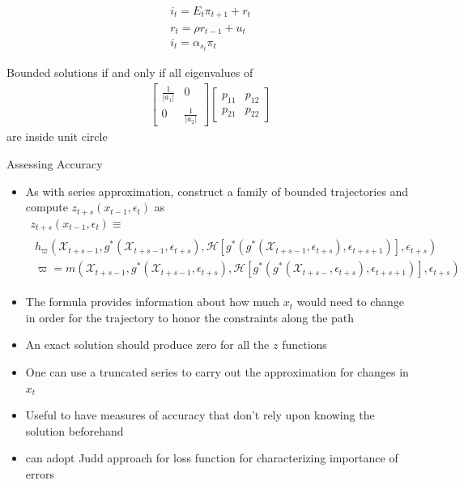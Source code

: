 \documentclass[12pt]{article}
\begin{document}
\cite{troy2007}
\begin{gather}
  \label{eq:4}
  i_t =E_t \pi_{t+1} + r_t\\
r_t= \rho r_{t-1} +u_t\\
i_t=\alpha_{s_t} \pi_t
\end{gather}

Bounded solutions if and only if all eigenvalues of 
\begin{gather}
  \label{eq:5}
  \begin{bmatrix}
    \frac{1}{|a_1|}&0\\
0&    \frac{1}{|a_2|}
  \end{bmatrix}
  \begin{bmatrix}
    p_{11}&p_{12}\\p_{21}&p_{22}
  \end{bmatrix}
\end{gather}
 are inside unit circle




  {Assessing Accuracy}
{\small

  \begin{itemize}
  \item As with series approximation,
 construct a family of bounded trajectories and compute
$  z_{t+s}(x_{t-1},\epsilon_t)$ as  %
{
\begin{gather}
  z_{t+s}(x_{t-1},\epsilon_t) \equiv\\
   \begin{split}
 h_{\varpi}(\mathcal{X}_{t+s-1},g^\ast(\mathcal{X}_{t+s-1},\epsilon_{t+s}),\mathcal{H}[g^\ast(g^\ast(\mathcal{X}_{t+s-1},\epsilon_{t+s}),\epsilon_{t+s+1})],\epsilon_{t+s}) \label{theProblem} \\
\varpi= m(\mathcal{X}_{t+s-1},g^\ast(\mathcal{X}_{t+s-1},\epsilon_{t+s}),\mathcal{H}[g^\ast(g^\ast(\mathcal{X}_{t+s-},\epsilon_{t+s}),\epsilon_{t+s+1})],\epsilon_{t+s}) 
   \end{split}
  \end{gather}
}
\item The formula  provides information about how much $x_{t}$ would need
to change in order for the trajectory to honor the constraints along the path
\item An exact solution should produce zero for all the $z$ functions
\item One can use a truncated series to carry out the approximation for changes in $x_t$
\item Useful to have measures of accuracy that don't rely upon knowing the solution beforehand
\item can adopt Judd approach for loss function for characterizing importance of errors
  \end{itemize}
}
\end{document}
